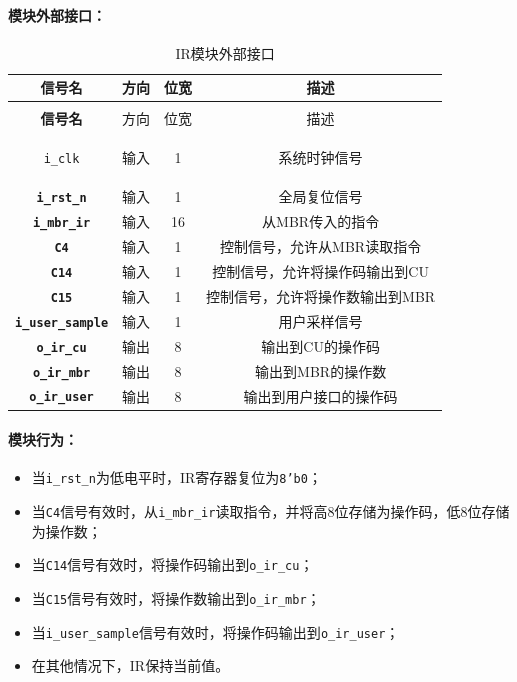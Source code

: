 \documentclass[lang=cn,a4paper,newtx]{elegantpaper}
\begin{document}
\paragraph{模块外部接口：}
\begin{longtable}{>{\bfseries}c c c c}
  \caption{IR模块外部接口} \\ 
  \toprule
  信号名 & 方向 & 位宽 & 描述 \\ 
  \midrule
  \endfirsthead

  \multicolumn{4}{l}{\textbf{（续表）IR模块外部接口}} \\ 
  \toprule
  信号名 & 方向 & 位宽 & 描述 \\ 
  \midrule
  \endhead

  \texttt{i\_clk} & 输入 & 1 & 系统时钟信号 \\ 
  \texttt{i\_rst\_n} & 输入 & 1 & 全局复位信号 \\ 
  \texttt{i\_mbr\_ir} & 输入 & 16 & 从MBR传入的指令 \\ 
  \texttt{C4} & 输入 & 1 & 控制信号，允许从MBR读取指令 \\ 
  \texttt{C14} & 输入 & 1 & 控制信号，允许将操作码输出到CU \\ 
  \texttt{C15} & 输入 & 1 & 控制信号，允许将操作数输出到MBR \\ 
  \texttt{i\_user\_sample} & 输入 & 1 & 用户采样信号 \\ 
  \texttt{o\_ir\_cu} & 输出 & 8 & 输出到CU的操作码 \\ 
  \texttt{o\_ir\_mbr} & 输出 & 8 & 输出到MBR的操作数 \\ 
  \texttt{o\_ir\_user} & 输出 & 8 & 输出到用户接口的操作码 \\ 
  \bottomrule
\end{longtable}

\paragraph{模块行为：}
\begin{itemize}
  \item 当\texttt{i\_rst\_n}为低电平时，IR寄存器复位为\texttt{8'b0}；
  \item 当\texttt{C4}信号有效时，从\texttt{i\_mbr\_ir}读取指令，并将高8位存储为操作码，低8位存储为操作数；
  \item 当\texttt{C14}信号有效时，将操作码输出到\texttt{o\_ir\_cu}；
  \item 当\texttt{C15}信号有效时，将操作数输出到\texttt{o\_ir\_mbr}；
  \item 当\texttt{i\_user\_sample}信号有效时，将操作码输出到\texttt{o\_ir\_user}；
  \item 在其他情况下，IR保持当前值。
\end{itemize}
\end{document}
